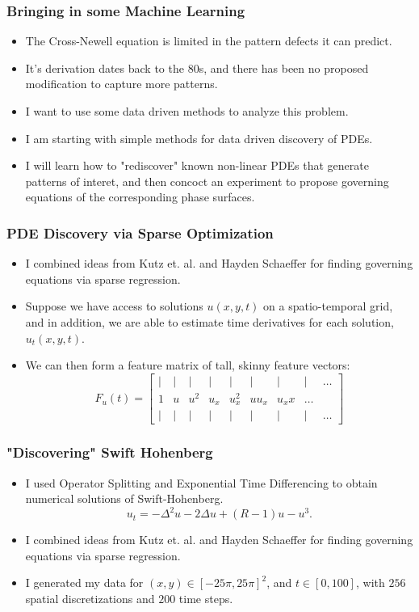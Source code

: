 \documentclass[]{beamer}
\begin{document}
\begin{frame}
     \frametitle{Bringing in some Machine Learning}
     \begin{itemize}
         \item The Cross-Newell equation is limited in the pattern defects it can predict.
        \item It's derivation dates back to the 80s, and there has been no proposed modification to capture more patterns.
        \item I want to use some data driven methods to analyze this problem.
        \item I am starting with simple methods for data driven discovery of PDEs.
        \item I will learn how to "rediscover" known non-linear PDEs that generate patterns of interet, and then concoct an experiment to propose governing equations of the corresponding phase surfaces.
     \end{itemize}
\end{frame}

\begin{frame}
    \frametitle{PDE Discovery via Sparse Optimization}
\begin{itemize}
  \item I combined ideas from Kutz et. al. and Hayden Schaeffer for finding governing equations via sparse regression.
  \item Suppose we have access to solutions $u(x,y,t)$ on a spatio-temporal grid, and in addition, we are able to estimate time derivatives for each solution, $u_t(x,y,t)$. 
\item 
    We can then form a feature matrix of tall, skinny feature vectors:
    \[
        F_u(t) = \begin{bmatrix}| & | & | & | & | & | & | & | & \dots\\
                                1 & u & u^2 & u_x & u_x^2 & uu_x & u_xx &\dots\\
                                | & | & | & | & | & | & | & | & \dots
                 \end{bmatrix}
    \] 
\end{itemize}
\end{frame}

\begin{frame}
     \frametitle{"Discovering" Swift Hohenberg}
     \begin{itemize}
         \item I used Operator Splitting and Exponential Time Differencing to obtain numerical solutions of Swift-Hohenberg.
             \[
                 u_t = -\Delta^2 u - 2\Delta u + (R-1)u - u^3.
             \] 
        \item I combined ideas from Kutz et. al. and Hayden Schaeffer for finding governing equations via sparse regression.
        \item I generated my data for $(x,y) \in [-25\pi,25\pi]^2$, and $t \in [0,100]$, with $256$ spatial discretizations and $200$ time steps.
     \end{itemize}
\end{frame}
\end{document}
